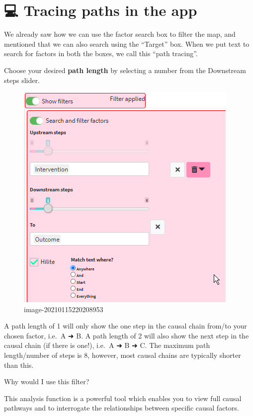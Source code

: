 \documentclass[
]{book}
\begin{document}
\hypertarget{tracing-paths-in-the-app}{%
\section{💻 Tracing paths in the app}\label{tracing-paths-in-the-app}}

We already saw how we can use the factor search box to filter the map, and mentioned that we can also search using the ``Target'' box. When we put text to search for factors in both the boxes, we call this ``path tracing''.

Choose your desired \textbf{path length} by selecting a number from the Downstream steps slider.

\begin{figure}
\centering
\includegraphics{_assets/image-20210115220208953.png}
\caption{image-20210115220208953}
\end{figure}

A path length of 1 will only show the one step in the causal chain from/to your chosen factor, i.e.~A ➜ B. A path length of 2 will also show the next step in the causal chain (if there is one!), i.e.~A ➜ B ➜ C. The maximum path length/number of steps is 8, however, most causal chains are typically shorter than this.

Why would I use this filter?

This analysis function is a powerful tool which enables you to view full causal pathways and to interrogate the relationships between specific causal factors.
\end{document}
